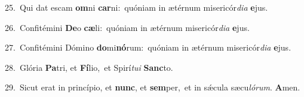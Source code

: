 {\numbfont\textcolor{\numbcolor}{25.}}~Qui dat escam \textbf{om}\-ni \textbf{car}\-ni:~\star quóniam in ætérnum misericór\-\textit{di}\-\textit{a} \textbf{e}\-jus.\par
{\numbfont\textcolor{\numbcolor}{26.}}~Confitémini \textbf{De}\-o \textbf{cæ}\-li:~\star quóniam in ætérnum misericór\-\textit{di}\-\textit{a} \textbf{e}\-jus.\par
{\numbfont\textcolor{\numbcolor}{27.}}~Confitémini Dómino \textbf{do}\-mi\-\textbf{nó}\-rum:~\star quóniam in ætérnum misericór\-\textit{di}\-\textit{a} \textbf{e}\-jus.\par
{\numbfont\textcolor{\numbcolor}{28.}}~Glória \textbf{Pa}\-tri, et \textbf{Fí}\-lio,~\star et Spirí\-\textit{tu}\-\textit{i} \textbf{Sanc}\-to.\par
{\numbfont\textcolor{\numbcolor}{29.}}~Sicut erat in princípio, et \textbf{nunc}\-, et \textbf{sem}\-per,~\star et in sǽcula sæcu\-\textit{ló}\-\textit{rum}. \textbf{A}\-men.\par
